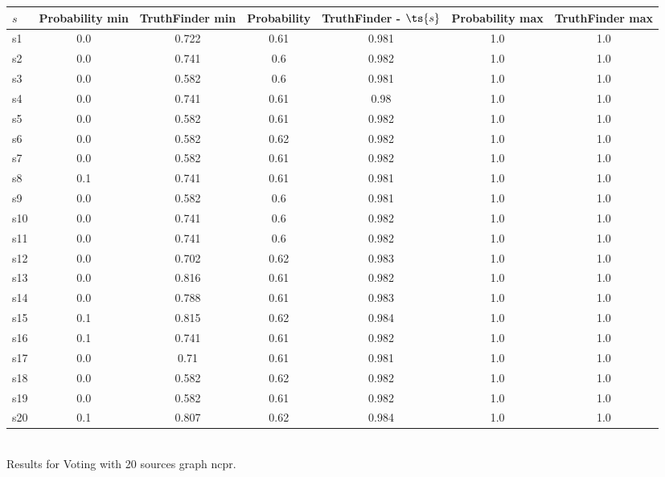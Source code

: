\documentclass{article}
\begin{document}
\noindent\begin{tabular}{|l|c|c|c|c|c|c|}
\hline
$s$& Probability min & TruthFinder min & Probability & TruthFinder - $\ts{s}$ & Probability max & TruthFinder max\\
\hline
s1 &0.0 & 0.722 & 0.61 & 0.981 & 1.0 & 1.0\\
\hline
s2 &0.0 & 0.741 & 0.6 & 0.982 & 1.0 & 1.0\\
\hline
s3 &0.0 & 0.582 & 0.6 & 0.981 & 1.0 & 1.0\\
\hline
s4 &0.0 & 0.741 & 0.61 & 0.98 & 1.0 & 1.0\\
\hline
s5 &0.0 & 0.582 & 0.61 & 0.982 & 1.0 & 1.0\\
\hline
s6 &0.0 & 0.582 & 0.62 & 0.982 & 1.0 & 1.0\\
\hline
s7 &0.0 & 0.582 & 0.61 & 0.982 & 1.0 & 1.0\\
\hline
s8 &0.1 & 0.741 & 0.61 & 0.981 & 1.0 & 1.0\\
\hline
s9 &0.0 & 0.582 & 0.6 & 0.981 & 1.0 & 1.0\\
\hline
s10 &0.0 & 0.741 & 0.6 & 0.982 & 1.0 & 1.0\\
\hline
s11 &0.0 & 0.741 & 0.6 & 0.982 & 1.0 & 1.0\\
\hline
s12 &0.0 & 0.702 & 0.62 & 0.983 & 1.0 & 1.0\\
\hline
s13 &0.0 & 0.816 & 0.61 & 0.982 & 1.0 & 1.0\\
\hline
s14 &0.0 & 0.788 & 0.61 & 0.983 & 1.0 & 1.0\\
\hline
s15 &0.1 & 0.815 & 0.62 & 0.984 & 1.0 & 1.0\\
\hline
s16 &0.1 & 0.741 & 0.61 & 0.982 & 1.0 & 1.0\\
\hline
s17 &0.0 & 0.71 & 0.61 & 0.981 & 1.0 & 1.0\\
\hline
s18 &0.0 & 0.582 & 0.62 & 0.982 & 1.0 & 1.0\\
\hline
s19 &0.0 & 0.582 & 0.61 & 0.982 & 1.0 & 1.0\\
\hline
s20 &0.1 & 0.807 & 0.62 & 0.984 & 1.0 & 1.0\\
\hline
\end{tabular}\\

\noindent Results for Voting with 20 sources graph ncpr.
\end{document}
